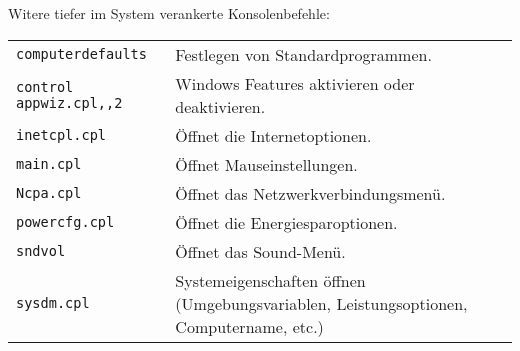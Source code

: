 Witere tiefer im System verankerte Konsolenbefehle:
\begin{tabular}{@{}p{\the\MyLen}
		@{}p{\linewidth-\the\MyLen}@{}}
	\texttt{computerdefaults} & Festlegen von Standardprogrammen.\\
	\texttt{control appwiz.cpl,,2} & Windows Features aktivieren oder deaktivieren.\\
	\texttt{inetcpl.cpl} & Öffnet die Internetoptionen.\\
	\texttt{main.cpl} & Öffnet Mauseinstellungen.\\
	\texttt{Ncpa.cpl} & Öffnet das Netzwerkverbindungsmenü.\\
	\texttt{powercfg.cpl} & Öffnet die Energiesparoptionen.\\
	\texttt{sndvol} & Öffnet das Sound-Menü.\\
	\texttt{sysdm.cpl} & Systemeigenschaften öffnen (Umgebungsvariablen, Leistungsoptionen, Computername, etc.)
	\end{tabular}

